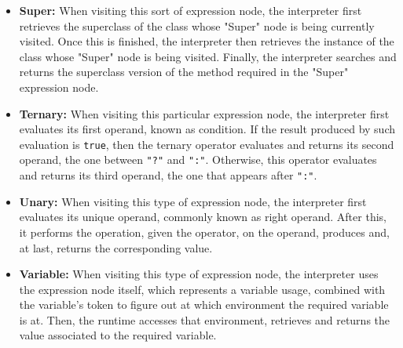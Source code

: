 \begin{itemize}
    \item \textbf{Super:} When visiting this sort of expression node, the interpreter first retrieves the superclass of the class whose "Super" node is being currently visited. Once this is finished, the interpreter then retrieves the instance of the class whose "Super" node is being visited. Finally, the interpreter searches and returns the superclass version of the method required in the "Super" expression node.    
    \item \textbf{Ternary:} When visiting this particular expression node, the interpreter first evaluates its first operand, known as condition. If the result produced by such evaluation is \texttt{true}, then the ternary operator evaluates and returns its second operand, the one between \texttt{"?"} and \texttt{":"}. Otherwise, this operator evaluates and returns its third operand, the one that appears after \texttt{":"}.
    \item \textbf{Unary:} When visiting this type of expression node, the interpreter first evaluates its unique operand, commonly known as right operand. After this, it performs the operation, given the operator, on the operand, produces and, at last, returns the corresponding value.
    \item \textbf{Variable:} When visiting this type of expression node, the interpreter uses the expression node itself, which represents a variable usage, combined with the variable's token to figure out at which environment the required variable is at. Then, the runtime accesses that environment, retrieves and returns the value associated to the required variable. 
\end{itemize}

